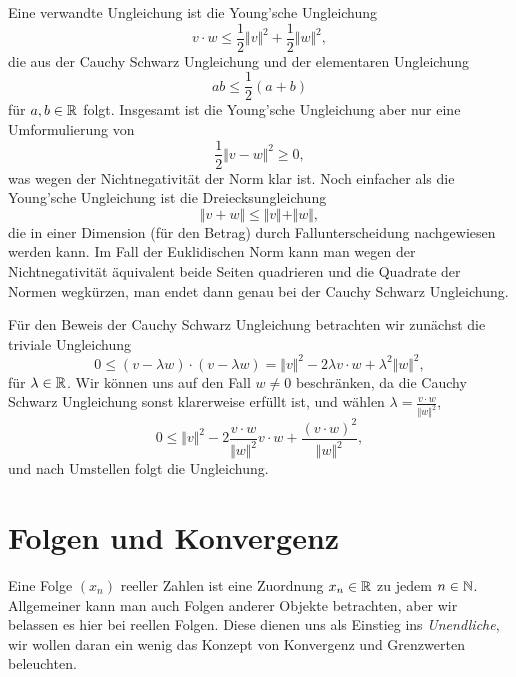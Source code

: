 Eine verwandte Ungleichung ist die Young’sche Ungleichung
\begin{equation*}
  v \cdot w \leq \frac{1}2 \Vert v \Vert^2 + \frac{1}2\Vert w  \Vert^2,\end{equation*}
die aus der Cauchy Schwarz Ungleichung und der elementaren Ungleichung
\begin{equation*}
 ab \leq \frac{1}2 (a+b)\end{equation*}
für \(a,b \in \mathbb{R}\) folgt. Insgesamt ist die Young’sche Ungleichung aber nur eine Umformulierung von
\begin{equation*}
 \frac{1}2 \Vert v - w \Vert^2 \geq 0,\end{equation*}
was wegen der Nichtnegativität der Norm klar ist. Noch einfacher als die Young’sche Ungleichung ist die Dreiecksungleichung
\begin{equation*}
 \Vert v + w\Vert \leq \Vert v \Vert + \Vert w \Vert,\end{equation*}
die in einer Dimension (für den Betrag) durch Fallunterscheidung nachgewiesen werden kann. Im Fall der Euklidischen Norm kann man wegen der Nichtnegativität äquivalent beide Seiten quadrieren und die Quadrate der Normen wegkürzen, man endet dann genau bei der Cauchy Schwarz Ungleichung.

Für den Beweis der Cauchy Schwarz Ungleichung betrachten wir zunächst die triviale Ungleichung
\begin{equation*}
 0 \leq (v-\lambda w)\cdot (v-\lambda w) = \Vert v \Vert^2 - 2 \lambda v \cdot w + \lambda^2 \Vert w \Vert^2,\end{equation*}
für \(\lambda \in \mathbb{R}\). Wir können uns auf den Fall \(w \neq 0\) beschränken, da die Cauchy Schwarz Ungleichung sonst klarerweise erfüllt ist, und wählen \(\lambda = \frac{v\cdot w}{\Vert w \Vert^2}\),
\begin{equation*}
 0 \leq  \Vert v \Vert^2 - 2 \frac{v\cdot w}{\Vert w \Vert^2}  v \cdot w + \frac{(v\cdot w)^2}{\Vert w \Vert^2} ,\end{equation*}
und nach Umstellen folgt die Ungleichung.


\section{Folgen und Konvergenz}
\label{\detokenize{vorkurs/folgen:folgen-und-konvergenz}}\label{\detokenize{vorkurs/folgen::doc}}
Eine Folge \((x_n)\) reeller Zahlen ist eine Zuordnung \(x_n \in \mathbb{R}\) zu jedem \(n \in \mathbb{N}\). Allgemeiner kann man auch Folgen anderer Objekte betrachten, aber wir belassen es hier bei reellen Folgen. Diese dienen uns als Einstieg ins \emph{Unendliche}, wir wollen daran ein wenig das Konzept von Konvergenz und Grenzwerten beleuchten.

